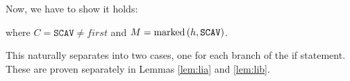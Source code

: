 \begin{lemma}
  Now, we have to show it holds:

  \begin{prooftree}
  \end{prooftree}

  where $C = \mathtt{SCAV} \neq first$ and $M =
  \marked{h}{\mathtt{SCAV}}$.

  This naturally separates into two cases, one for each branch of the
  if statement. These are proven separately in Lemmas \ref{lem:lia}
  and \ref{lem:lib}.
  \label{lem:li}
\end{lemma}

